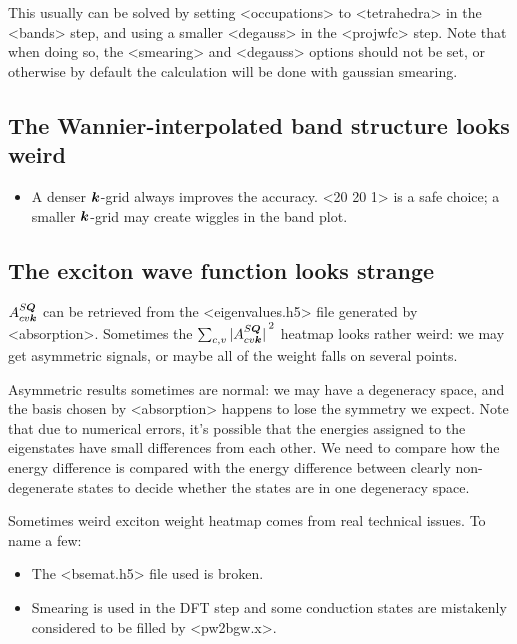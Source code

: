 \documentclass[hyperref, a4paper, 12pt]{report}
\def\texttt#1{<#1>}%
\newcommand{\shortcode}[1]{\texttt{#1}}
\begin{document}
This usually can be solved by 
setting \shortcode{occupations} to \shortcode{tetrahedra}
in the \shortcode{bands} step,
and using a smaller \shortcode{degauss} in the \shortcode{projwfc} step.
Note that when doing so, 
the \shortcode{smearing} and \shortcode{degauss} options 
should not be set, 
or otherwise by default the calculation will be done with gaussian smearing.

\subsection{The Wannier-interpolated band structure looks weird}

\begin{itemize}
    \item A denser $\vb*{k}$-grid always improves the accuracy. 
        \shortcode{20 20 1} is a safe choice; 
        a smaller $\vb*{k}$-grid may create wiggles in the band plot. 
\end{itemize}

\subsection{The exciton wave function looks strange} 

$A^{S\vb*{Q}}_{cv \vb*{k}}$ can be retrieved from 
the \shortcode{eigenvalues.h5} file generated by \shortcode{absorption}.
Sometimes the $\sum_{c, v} \abs*{A^{S \vb*{Q}}_{cv \vb*{k}}}^2$ 
heatmap looks rather weird: 
we may get asymmetric signals, 
or maybe all of the weight falls on several points. 

Asymmetric results sometimes are normal: 
we may have a degeneracy space, 
and the basis chosen by \shortcode{absorption} happens to 
lose the symmetry we expect. 
Note that due to numerical errors, 
it's possible that the energies assigned to the eigenstates 
have small differences from each other.
We need to compare how the energy difference is compared with the 
energy difference between clearly non-degenerate states 
to decide whether the states are in one degeneracy space. 

Sometimes weird exciton weight heatmap 
comes from real technical issues. To name a few: 
\begin{itemize}
    \item The \shortcode{bsemat.h5} file used is broken. 
    \item Smearing is used in the DFT step 
        and some conduction states are mistakenly considered to be filled 
        by \shortcode{pw2bgw.x}. 
\end{itemize}



\end{document}
